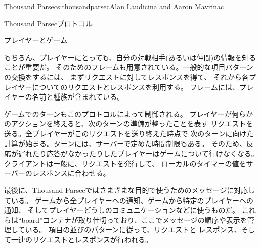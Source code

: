 \begin{aosachapter}{Thousand Parsec}{s:thousandparsec}{Alan Laudicina and Aaron Mavrinac}
\begin{aosasect1}{Thousand Parsecプロトコル}
\begin{aosasect2}{プレイヤーとゲーム}
\begin{aosaitemize}
\end{aosaitemize}

もちろん、プレイヤーにとっても、自分の対戦相手(あるいは仲間)の情報を知ることが重要だ。
そのためのフレームも用意されている。一般的な項目パターンの交換をするには、
まずリクエストに対してレスポンスを得て、
それから各プレイヤーについてのリクエストとレスポンスを利用する。
フレームには、プレイヤーの名前と種族が含まれている。

ゲームでのターンもこのプロトコルによって制御される。
プレイヤーが何らかのアクションを終えると、次のターンの準備が整ったことを表す
リクエストを送る。全プレイヤーがこのリクエストを送り終えた時点で
次のターンに向けた計算が始まる。ターンには、サーバーで定めた時間制限もある。
そのため、反応が遅れたり応答がなかったりしたプレイヤーはゲームについて行けなくなる。
クライアントは一般に、リクエストを発行して、
ローカルのタイマーの値をサーバーのレスポンスに合わせる。

最後に、Thousand Parsecではさまざまな目的で使うためのメッセージに対応している。
ゲームから全プレイヤーへの通知、ゲームから特定のプレイヤーへの通知、
そしてプレイヤーどうしのコミュニケーションなどに使うものだ。
これらは``board''コンテナが取り仕切っており、ここでメッセージの順序や表示を管理している。
項目の並びのパターンに従って、リクエストと
レスポンス、そして一連のリクエストとレスポンスが行われる。


\end{aosasect2}
\end{aosasect1}
\end{aosachapter}
